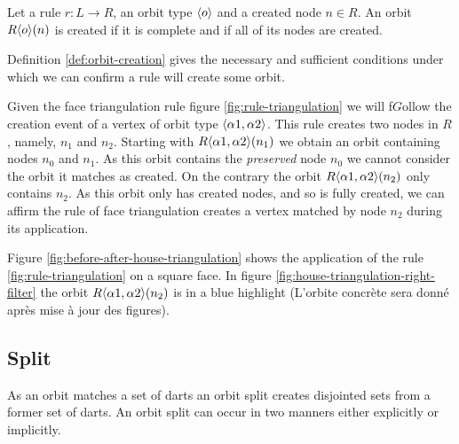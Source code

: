\documentclass[times,twocolumn,final]{els-format/elsarticle}
\begin{document}
\begin{definition}
  \label{def:orbit-creation}
  Let a rule $r : L \longrightarrow R$, an orbit type $\langle o\rangle$ and a created
  node $n \in R$. An orbit $R\langle o\rangle(n)$ is created if it is complete and if
  all of its nodes are created.
\end{definition}



Definition \ref{def:orbit-creation} gives the necessary and sufficient conditions
under which we can confirm a rule will create some orbit.

Given the face triangulation rule figure \ref{fig:rule-triangulation} we will
f$G$ollow the creation event of a vertex of orbit type
$\langle\alpha 1, \alpha 2\rangle$. This rule creates two nodes in $R$, namely,
$n_{1}$ and $n_{2}$. Starting with $R\langle\alpha 1, \alpha 2\rangle(n_{1})$ we
obtain an orbit containing nodes $n_{0}$ and $n_{1}$. As this orbit contains the
\emph{preserved} node $n_{0}$ we cannot consider the orbit it matches as
created. On the contrary the orbit $R\langle\alpha 1, \alpha 2\rangle(n_{2})$ only
contains $n_{2}$. As this orbit only has created nodes, and so is fully created,
we can affirm the rule of face triangulation creates a vertex matched by node
$n_{2}$ during its application.

Figure \ref{fig:before-after-house-triangulation} shows the application of the
rule \ref{fig:rule-triangulation} on a square face. In figure
\ref{fig:house-triangulation-right-filter} the orbit
$R\langle\alpha 1, \alpha 2\rangle(n_{2})$ is in a blue highlight (L'orbite concrète
sera donné après mise à jour des figures).

\subsection[Split]{Split}
\label{sec:split}

 As an orbit matches a set of darts an orbit split creates
disjointed sets from a former set of darts. An orbit split can occur in two
manners either explicitly or implicitly.
\end{document}
